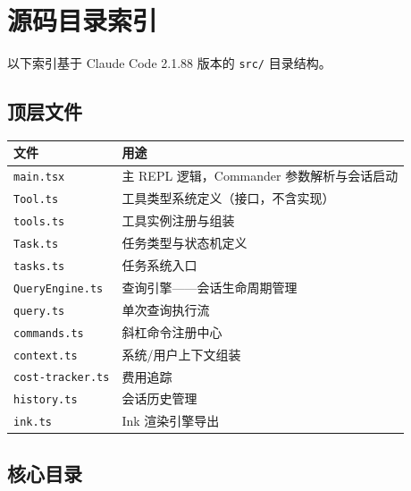 \chapter{源码目录索引}

以下索引基于 Claude Code 2.1.88 版本的 \texttt{src/} 目录结构。

\section*{顶层文件}

{\small
\begin{longtable}{lp{9cm}}
\toprule
\textbf{文件} & \textbf{用途} \\
\midrule
\endhead
\texttt{main.tsx} & 主 REPL 逻辑，Commander 参数解析与会话启动 \\
\texttt{Tool.ts} & 工具类型系统定义（接口，不含实现） \\
\texttt{tools.ts} & 工具实例注册与组装 \\
\texttt{Task.ts} & 任务类型与状态机定义 \\
\texttt{tasks.ts} & 任务系统入口 \\
\texttt{QueryEngine.ts} & 查询引擎——会话生命周期管理 \\
\texttt{query.ts} & 单次查询执行流 \\
\texttt{commands.ts} & 斜杠命令注册中心 \\
\texttt{context.ts} & 系统/用户上下文组装 \\
\texttt{cost-tracker.ts} & 费用追踪 \\
\texttt{history.ts} & 会话历史管理 \\
\texttt{ink.ts} & Ink 渲染引擎导出 \\
\bottomrule
\end{longtable}
}

\section*{核心目录}

